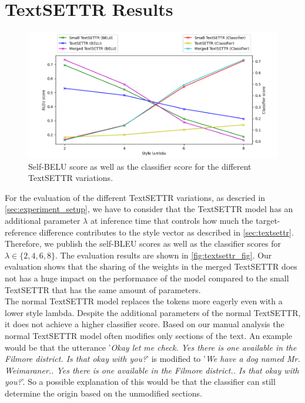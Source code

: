 \documentclass[twocolumn]{tum-article}
\begin{document}
\section{TextSETTR Results}
\begin{figure}[!h]
\centering
\includegraphics[width=\textwidth]{figures/eval_plot.png}
\caption{Self-BELU score as well as the classifier score for the different TextSETTR variations.}
\label{fig:textsettr_fig}
\end{figure}
For the evaluation of the different TextSETTR variations, as descried in \autoref{sec:experiment_setup}, we have to consider that the TextSETTR model has an additional parameter $\lambda$ at inference time that controls how much the target-reference difference contributes to the style vector as described in \autoref{sec:textsettr}. Therefore, we publish the self-BLEU scores as well as the classifier scores for $\lambda \in \{2,4,6,8\}$. The evaluation results are shown in \autoref{fig:textsettr_fig}. Our evaluation shows that the sharing of the weights in the merged TextSETTR does not has a huge impact on the performance of the model compared to the small TextSETTR that has the same amount of parameters.\\ 
The normal TextSETTR model replaces the tokens more eagerly even with a lower style lambda. Despite the additional parameters of the normal TextSETTR, it does not achieve a higher classifier score. Based on our manual analysis the normal TextSETTR model often modifies only sections of the text. An example would be that the utterance '\textit{Okay let me check. Yes there is one available in the Filmore district. Is that okay with you?}' is modified to '\textit{We have a dog named Mr. Weimaraner.. Yes there is one available in the Filmore district.. Is that okay with you?}'. So a possible explanation of this would be that the classifier can still determine the origin based on the unmodified sections.\\
\end{document}
